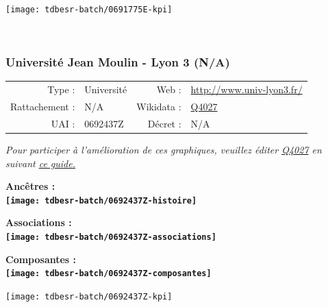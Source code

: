 \documentclass[12pt,french,]{article}
\begin{document}
\begin{center}\texttt{[image: tdbesr-batch/0691775E-kpi]} \end{center}\checkoddpage

\ifoddpage \fi ~\newpage  

\hypertarget{universituxe9-jean-moulin---lyon-3-na}{%
\subsubsection{Université Jean Moulin - Lyon 3
(N/A)}\label{universituxe9-jean-moulin---lyon-3-na}}

\begin{tabular*}{\textwidth}{rp{5cm}rl}  
\hline  
Type : & Université & Web : &\href{http://www.univ-lyon3.fr/}{http://www.univ-lyon3.fr/} \\  
Rattachement : & N/A & Wikidata : & \href{https://www.wikidata.org/entity/Q4027}{Q4027} \\  
UAI : & 0692437Z & Décret : & N/A \\  
\hline  
\end{tabular*}

\textit{\scriptsize Pour participer à l'amélioration de ces graphiques, veuillez éditer  \href{https://www.wikidata.org/entity/Q4027}{Q4027}  en suivant \href{https://github.com/cpesr/wikidataESR/blob/master/Rmd/wikidataESR.md}{ce guide.}}

\vspace{1cm}  
\begin{minipage}[b]{0.50\textwidth}\begin{center} \bf Ancêtres : \\  
\texttt{[image: tdbesr-batch/0692437Z-histoire]} \end{center}\end{minipage}\begin{minipage}[b]{0.50\textwidth}\begin{center} \bf Associations : \\  
\texttt{[image: tdbesr-batch/0692437Z-associations]} \end{center}\end{minipage}

\hrulefill

\begin{center} \bf Composantes : \\  
\texttt{[image: tdbesr-batch/0692437Z-composantes]} \end{center}

\begin{center}\texttt{[image: tdbesr-batch/0692437Z-kpi]} \end{center}\checkoddpage
\end{document}
